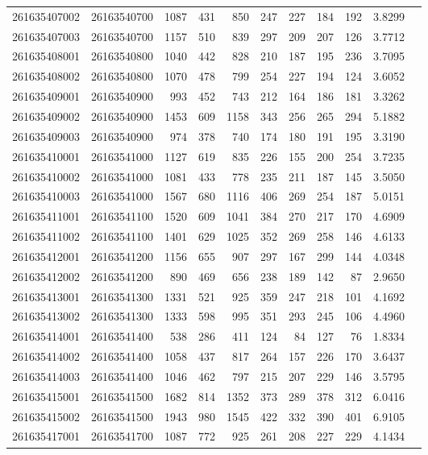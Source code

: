 \documentclass[11pt,landscape]{article}
\begin{document}
{\begin{longtable}[]{@{}lrrrrrrrrrr@{}}
261635407002 & 26163540700 & 1087 & 431 & 850 & 247 & 227 & 184 & 192 & 3.8299 \\
261635407003 & 26163540700 & 1157 & 510 & 839 & 297 & 209 & 207 & 126 & 3.7712 \\
261635408001 & 26163540800 & 1040 & 442 & 828 & 210 & 187 & 195 & 236 & 3.7095 \\
261635408002 & 26163540800 & 1070 & 478 & 799 & 254 & 227 & 194 & 124 & 3.6052 \\
261635409001 & 26163540900 & 993 & 452 & 743 & 212 & 164 & 186 & 181 & 3.3262 \\
261635409002 & 26163540900 & 1453 & 609 & 1158 & 343 & 256 & 265 & 294 & 5.1882 \\
261635409003 & 26163540900 & 974 & 378 & 740 & 174 & 180 & 191 & 195 & 3.3190 \\
261635410001 & 26163541000 & 1127 & 619 & 835 & 226 & 155 & 200 & 254 & 3.7235 \\
261635410002 & 26163541000 & 1081 & 433 & 778 & 235 & 211 & 187 & 145 & 3.5050 \\
261635410003 & 26163541000 & 1567 & 680 & 1116 & 406 & 269 & 254 & 187 & 5.0151 \\
261635411001 & 26163541100 & 1520 & 609 & 1041 & 384 & 270 & 217 & 170 & 4.6909 \\
261635411002 & 26163541100 & 1401 & 629 & 1025 & 352 & 269 & 258 & 146 & 4.6133 \\
261635412001 & 26163541200 & 1156 & 655 & 907 & 297 & 167 & 299 & 144 & 4.0348 \\
261635412002 & 26163541200 & 890 & 469 & 656 & 238 & 189 & 142 & 87 & 2.9650 \\
261635413001 & 26163541300 & 1331 & 521 & 925 & 359 & 247 & 218 & 101 & 4.1692 \\
261635413002 & 26163541300 & 1333 & 598 & 995 & 351 & 293 & 245 & 106 & 4.4960 \\
261635414001 & 26163541400 & 538 & 286 & 411 & 124 & 84 & 127 & 76 & 1.8334 \\
261635414002 & 26163541400 & 1058 & 437 & 817 & 264 & 157 & 226 & 170 & 3.6437 \\
261635414003 & 26163541400 & 1046 & 462 & 797 & 215 & 207 & 229 & 146 & 3.5795 \\
261635415001 & 26163541500 & 1682 & 814 & 1352 & 373 & 289 & 378 & 312 & 6.0416 \\
261635415002 & 26163541500 & 1943 & 980 & 1545 & 422 & 332 & 390 & 401 & 6.9105 \\
261635417001 & 26163541700 & 1087 & 772 & 925 & 261 & 208 & 227 & 229 & 4.1434 \\

\end{longtable}}
\end{document}
